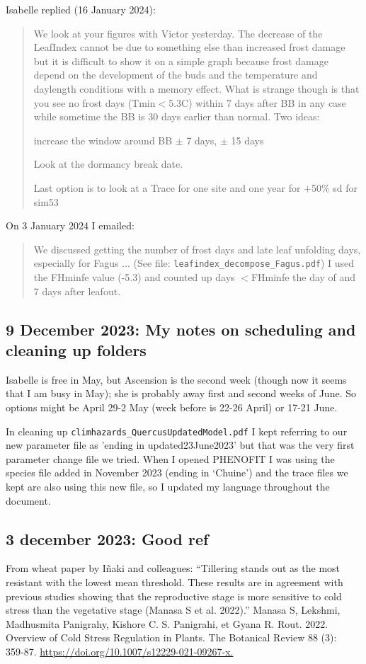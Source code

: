 \documentclass[11pt,letter]{article}
\begin{document}
Isabelle replied (16 January 2024):
\begin{quote}
We look at your figures with Victor yesterday. The decrease of the 
LeafIndex cannot be due to something else than increased frost damage 
but it is difficult to show it on a simple graph because frost damage 
depend on the development of the buds and the temperature and 
daylength conditions with a memory effect. What is strange though is 
that you see no frost days (Tmin$<$5.3C) within 7 days after BB in any 
case while sometime the BB is 30 days earlier than normal. Two ideas:

increase the window around BB $\pm$ 7 days, $\pm$ 15 days

Look at the dormancy break date.

Last option is to look at a Trace for one site and one year for $+$50\%  sd for sim53
\end{quote}

On 3 January 2024 I emailed: 
\begin{quote}
We discussed getting the number of frost days and late leaf unfolding days, especially for Fagus ... (See file: \verb|leafindex_decompose_Fagus.pdf|) I used the FHminfe value (-5.3) and counted up days $<$FHminfe the day of and 7 days
after leafout. 
\end{quote}


\subsection{9 December 2023:  My notes on scheduling and cleaning up folders}
Isabelle is free in May, but Ascension is the second week (though now it seems that I am busy in May); she is probably away first and second weeks of June. So options might be April 29-2 May (week before is 22-26 April) or 17-21 June.

In cleaning up \verb|climhazards_QuercusUpdatedModel.pdf| I kept referring to our new parameter file as 'ending in updated23June2023' but that was the very first parameter change file we tried. When I opened PHENOFIT I was using the species file added in November 2023 (ending in `Chuine') and the trace files we kept are also using this new file, so I updated my language throughout the document. 

\subsection{3 december 2023: Good ref}

From wheat paper by I\~naki and colleagues: ``Tillering stands out as the most resistant with the lowest mean threshold. These results are in agreement with previous studies showing that the reproductive stage is more sensitive to cold stress than the vegetative stage (Manasa S et al. 2022).''  Manasa S, Lekshmi, Madhusmita Panigrahy, Kishore C. S. Panigrahi, et Gyana R. Rout. 2022. Overview of Cold Stress Regulation in Plants. The Botanical Review 88 (3): 359‑87. \url{https://doi.org/10.1007/s12229-021-09267-x.}
\end{document}
